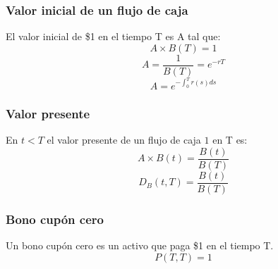 \begin{frame}
    \frametitle{Valor inicial de un flujo de caja}
    \begin{defin}
        El valor inicial de \$1 en el tiempo T es A tal que:
        \begin{equation*}
            A \times B(T) = 1
        \end{equation*}
        \begin{equation*}
            A = \frac{1}{B(T)} = e^{-rT}
        \end{equation*}
        \begin{equation*}
            A = e^{-\int_0^T r(s)ds}
        \end{equation*}
    \end{defin}
\end{frame}

\begin{frame}
    \frametitle{Valor presente}
    \begin{defin}
        En $t<T$ el valor presente de un flujo de caja $1$ en T es:
        \begin{equation*}
            A \times B(t) = \frac{B(t)}{B(T)}
        \end{equation*}
        \begin{equation*}
           D_B(t,T) = \frac{B(t)}{B(T)}
        \end{equation*}
    \end{defin}
\end{frame}

\begin{frame}
    \frametitle{Bono cupón cero}
    \begin{defin}
        Un bono cupón cero es un activo que paga \$1 en el tiempo T.\\
        \begin{equation*}
            P(T, T) = 1  
        \end{equation*}
    \end{defin}
\end{frame}

